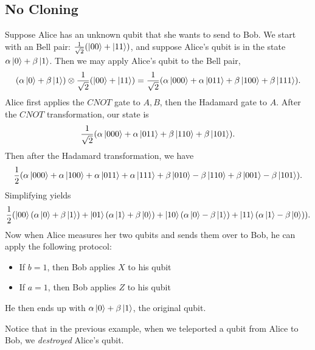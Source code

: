 \documentclass[class=article, crop=false]{standalone}
\begin{document}
  \subsection{No Cloning}
  Suppose Alice has an unknown qubit that she wants to send to Bob. We start with an Bell pair: $\frac{1}{\sqrt{2}}(\left\lvert 00 \right\rangle + \left\lvert 11 \right\rangle)$, and suppose Alice's qubit is in the state $\alpha\left\lvert 0 \right\rangle + \beta\left\lvert 1 \right\rangle$. Then we may apply Alice's qubit to the Bell pair,
  \[
    (\alpha\left\lvert 0 \right\rangle + \beta\left\lvert 1 \right\rangle)\otimes \frac{1}{\sqrt{2}}(\left\lvert 00 \right\rangle + \left\lvert 11 \right\rangle) = \frac{1}{\sqrt{2}}(\alpha\left\lvert 000 \right\rangle + \alpha\left\lvert 011 \right\rangle + \beta\left\lvert 100 \right\rangle + \beta\left\lvert 111 \right\rangle).
  \]
  Alice first applies the $CNOT$ gate to $A, B$, then the Hadamard gate to $A$. After the $CNOT$ transformation, our state is
  \[
    \frac{1}{\sqrt{2}}(\alpha\left\lvert 000 \right\rangle + \alpha\left\lvert 011 \right\rangle + \beta\left\lvert 110 \right\rangle + \beta\left\lvert 101 \right\rangle).
  \]
  Then after the Hadamard transformation, we have
  \[
    \frac{1}{2}(\alpha\left\lvert 000 \right\rangle + \alpha\left\lvert 100 \right\rangle + \alpha\left\lvert 011 \right\rangle + \alpha\left\lvert 111 \right\rangle + \beta\left\lvert 010 \right\rangle - \beta\left\lvert 110 \right\rangle + \beta\left\lvert 001 \right\rangle - \beta\left\lvert 101 \right\rangle).
  \]
  Simplifying yields
  \[
    \frac{1}{2}(\left\lvert 00 \right\rangle(\alpha\left\lvert 0 \right\rangle + \beta\left\lvert 1 \right\rangle) + \left\lvert 01 \right\rangle(\alpha\left\lvert 1 \right\rangle + \beta\left\lvert 0 \right\rangle) + \left\lvert 10 \right\rangle(\alpha\left\lvert 0 \right\rangle - \beta\left\lvert 1 \right\rangle) + \left\lvert 11 \right\rangle(\alpha\left\lvert 1 \right\rangle - \beta\left\lvert 0 \right\rangle)).
  \]
  Now when Alice measures her two qubits and sends them over to Bob, he can apply the following protocol:
  \begin{itemize}
    \item If $b = 1$, then Bob applies $X$ to his qubit
    \item If $a = 1$, then Bob applies $Z$ to his qubit
  \end{itemize}
  He then ends up with $\alpha\left\lvert 0 \right\rangle + \beta\left\lvert 1 \right\rangle$, the original qubit. \par
  Notice that in the previous example, when we teleported a qubit from Alice to Bob, we \emph{destroyed} Alice's qubit.
\end{document}
